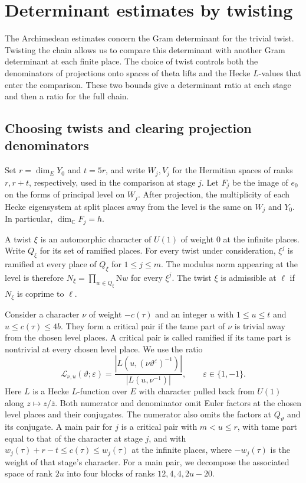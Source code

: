 \section{Determinant estimates by twisting}
\label{sec:determinant-estimates}

The Archimedean estimates concern the Gram determinant for the trivial
twist. Twisting the chain allows us to compare this determinant with
another Gram determinant at each finite place. The choice of twist
controls both the denominators of projections onto spaces of theta lifts
and the Hecke \(L\)-values that enter the comparison. These two bounds
give a determinant ratio at each stage and then a ratio for the full chain.

\subsection{Choosing twists and clearing projection denominators}\label{subsec:denominator-twists}

Set \(r=\dim_E Y_0\) and \(t=5r\), and write \(W_j,V_j\) for the
Hermitian spaces of ranks \(r,r+t\), respectively, used in the comparison
at stage \(j\). Let \(F_j\) be the image of \(e_0\) on the forms of
principal level on \(W_j\). After projection, the multiplicity of each
Hecke eigensystem at split places away from the level is the same on
\(W_j\) and \(Y_0\). In particular, \(\dim_{\mathbb C} F_j=h\).

A twist \(\xi\) is an automorphic character of \(U(1)\) of weight \(0\) at
the infinite places. Write \(Q_\xi\) for its set of ramified places.
For every twist under consideration, \(\xi^j\) is ramified at every
place of \(Q_\xi\) for \(1\le j\le m\). The modulus norm appearing
at the level is therefore \(N_\xi=\prod_{w\in Q_\xi}\mathrm Nw\) for
every \(\xi^j\). The twist \(\xi\) is admissible at \(\ell\) if \(N_\xi\)
is coprime to \(\ell\).

Consider a character \(\nu\) of weight \(-c(\tau)\) and an integer \(u\)
with \(1\le u\le t\) and \(u\le c(\tau)\le4b\). They form a critical
pair if the tame part of \(\nu\) is trivial away from the chosen level
places. A critical pair is called ramified if its tame part is nontrivial
at every chosen level place. We use the ratio
\[
 \mathcal L_{\nu,u}(\vartheta;\varepsilon)
 =
 \frac{|L(u,(\nu\vartheta^\varepsilon)^{-1})|}
      {|L(u,\nu^{-1})|},
 \qquad \varepsilon\in\{1,-1\}.
\]
Here \(L\) is a Hecke \(L\)-function over \(E\) with character pulled back
from \(U(1)\) along \(z\mapsto z/\bar z\). Both numerator and denominator
omit Euler factors at the chosen level places and their conjugates.
The numerator also omits the factors at \(Q_\vartheta\) and its conjugate.
A main pair for \(j\) is a critical pair with \(m<u\le r\), with tame
part equal to that of the character at stage \(j\), and with
\(w_j(\tau)+r-t\le c(\tau)\le w_j(\tau)\) at the infinite places, where
\(-w_j(\tau)\) is the weight of that stage's character. For a main pair,
we decompose the associated space of rank \(2u\) into four blocks of
ranks \(12,4,4,2u-20\).

